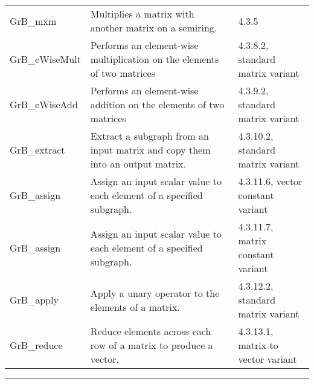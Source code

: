 \begin{table*}[h]
\begin{center}
\begin{tabular}{lll}
	{\sf GrB\_mxm}              & Multiplies a matrix with another matrix on a semiring.                            & 4.3.5 \\
	{\sf GrB\_eWiseMult}        & Performs an element-wise multiplication on the elements of two matrices           & 4.3.8.2, standard matrix variant  \\
	{\sf GrB\_eWiseAdd}         & Performs an element-wise addition on the elements of two matrices                 & 4.3.9.2, standard matrix variant \\
	{\sf GrB\_extract}          & Extract a subgraph from an input matrix and copy them into an output matrix.      & 4.3.10.2, standard matrix variant \\
	{\sf GrB\_assign}           & Assign an input scalar value to each element of a specified subgraph.             & 4.3.11.6, vector constant variant \\
	{\sf GrB\_assign}           & Assign an input scalar value to each element of a specified subgraph.             & 4.3.11.7, matrix constant variant \\
	{\sf GrB\_apply}            & Apply a unary operator to the elements of a matrix.                               & 4.3.12.2, standard matrix variant \\
	{\sf GrB\_reduce}           & Reduce elements across each row of a matrix to produce a vector.                  & 4.3.13.1, matrix to vector variant \\
\end{tabular}
\end{center}
\hrule
\end{table*}

